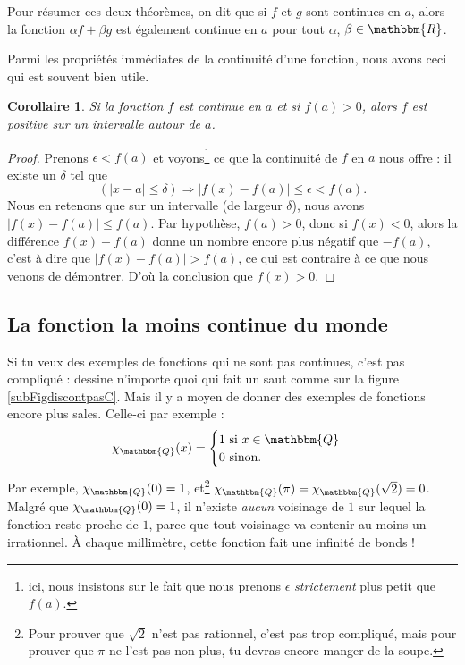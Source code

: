 \documentclass[a4paper,12pt]{book}
\newcommand{\eR}{\mathbbm{R}}
\newcommand{\eQ}{\mathbbm{Q}}
\newcounter{numtho}
\theoremstyle{mes_exemples}	\newtheorem{exemple}[numtho]{Exemple}
\theoremstyle{mes_tho}
\newtheorem{corollary}[numtho]{Corollaire}
\begin{document}
Pour résumer ces deux théorèmes, on dit que si $f$ et $g$ sont continues en $a$, alors la fonction $\alpha f+\beta g$ est également continue en $a$ pour tout $\alpha$, $\beta\in\eR$.

Parmi les propriétés immédiates de la continuité d'une fonction, nous avons ceci qui est souvent bien utile.

\begin{corollary}
Si la fonction $f$ est continue en $a$ et si $f(a)>0$, alors $f$ est positive sur un intervalle autour de $a$.
\end{corollary}

\begin{proof}
Prenons $\epsilon<f(a)$ et voyons\footnote{ici, nous insistons sur le fait que nous prenons $\epsilon$ \emph{strictement} plus petit que $f(a)$.} ce que la continuité de $f$ en $a$ nous offre : il existe un $\delta$ tel que
\[ 
  (| x-a |\leq \delta)\Rightarrow | f(x)-f(a) |\leq\epsilon < f(a).
\]
Nous en retenons que sur un intervalle (de largeur $\delta$), nous avons $| f(x)-f(a) |\leq f(a)$. Par hypothèse, $f(a)>0$, donc si $f(x)<0$, alors la différence $f(x)-f(a)$ donne un nombre encore plus négatif que $-f(a)$, c'est à dire que $| f(x)-f(a) |>f(a)$, ce qui est contraire à ce que nous venons de démontrer. D'où la conclusion que $f(x)>0$.
\end{proof}


\subsection{La fonction la moins continue du monde}

Si tu veux des exemples de fonctions qui ne sont pas continues, c'est pas compliqué : dessine n'importe quoi qui fait un saut comme sur la figure \ref{subFigdiscontpasC}. Mais il y a moyen de donner des exemples de fonctions encore plus sales. Celle-ci par exemple :
\[ 
  \chi_{\eQ}(x)=
\begin{cases}
	1 \text{ si $x\in\eQ$}\\
	0 \text{ sinon.}
\end{cases}
\]
Par exemple, $\chi_{\eQ}(0)=1$, et\footnote{Pour prouver que $\sqrt{2}$ n'est pas rationnel, c'est pas trop compliqué, mais pour prouver que $\pi$ ne l'est pas non plus, tu devras encore manger de la soupe.} $\chi_{\eQ}(\pi)=\chi_{\eQ}(\sqrt{2})=0$. Malgré que $\chi_{\eQ}(0)=1$, il n'existe \emph{aucun} voisinage de $1$ sur lequel la fonction reste proche de $1$, parce que tout voisinage va contenir au moins un irrationnel. À chaque millimètre, cette fonction fait une infinité de bonds !
\end{document}
